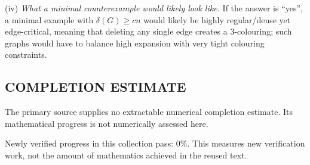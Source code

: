 (iv) \emph{What a minimal counterexample would likely look like.} If the answer is ``yes'', a minimal example with $\delta(G)\ge cn$ would likely be highly regular/dense yet edge-critical, meaning that deleting any single edge creates a 3-colouring; such graphs would have to balance high expansion with very tight colouring constraints.




\subsection*{COMPLETION ESTIMATE}
The primary source supplies no extractable numerical completion estimate. Its mathematical progress is not numerically assessed here.

Newly verified progress in this collection pass: $0\%$. This measures new verification work, not the amount of mathematics achieved in the reused text.
